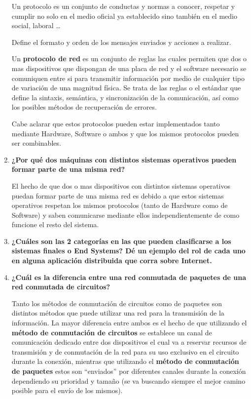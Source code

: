 \documentclass[a4paper,10pt]{article}
\begin{document}
\begin{enumerate}
	Un protocolo es un conjunto de conductas y normas a conocer, respetar y cumplir no solo en el medio oficial ya establecido sino también en el medio social, laboral \ldots
	
	Define el formato y orden de los mensajes enviados y acciones a realizar.
	
	Un \textbf{protocolo de red} es un conjunto de reglas las cuales permiten que dos o mas dispositivos que dispongan de una placa de red y el software necesario se comuniquen entre si para transmitir información por medio de cualquier tipo de variación de una magnitud física. Se trata de las reglas o el estándar que define la sintaxis, semántica, y sincronización de la comunicación, así como los posibles métodos de recuperación de errores. 

	Cabe aclarar que estos protocolos pueden estar implementados tanto mediante Hardware, Software o ambos y que los mismos protocolos pueden ser combinables. \\
	
	\item \textbf{¿Por qué dos máquinas con distintos sistemas operativos pueden formar parte de una misma red?}
	
	El hecho de que dos o mas dispositivos con distintos sistemas operativos puedan formar parte de una misma red es debido a que estos sistemas operativos respetan los mismos protocolos (tanto de Hardware como de Software) y saben comunicarse mediante ellos independientemente de como funcione el resto del sistema. \\
	
	\item \textbf{¿Cuáles son las 2 categorías en las que pueden clasificarse a los sistemas finales o End Systems? Dé un ejemplo del rol de cada uno en alguna aplicación distribuida que corra sobre Internet.} \\
	
	\item \textbf{¿Cuál es la diferencia entre una red conmutada de paquetes de una red conmutada de circuitos?}
	
	Tanto los métodos de conmutación de circuitos como de paquetes son distintos métodos que puede utilizar una red para la transmisión de la información. La mayor diferencia entre ambos es el hecho de que utilizando el \textbf{método de conmutación de circuitos} se establece un canal de comunicación dedicado entre dos dispositivos el cual va a reservar recursos de transmisión y de conmutación de la red para su uso exclusivo en el circuito durante la conexión, mientras que utilizando el \textbf{método de conmutación de paquetes} estos son “enviados” por diferentes canales durante la conexión dependiendo su prioridad y tamaño (se va buscando siempre el mejor camino posible para el envío de los mismos). \\
	

\end{enumerate}
\end{document}
